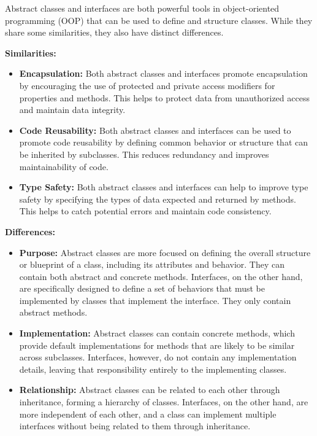 \documentclass[11pt]{article}
\begin{document}
Abstract classes and interfaces are both powerful tools in
object-oriented programming (OOP) that can be used to define and
structure classes. While they share some similarities, they also have
distinct differences.

\textbf{Similarities:}

\begin{itemize}
\item \textbf{Encapsulation:} Both abstract classes and interfaces promote
encapsulation by encouraging the use of protected and private access
modifiers for properties and methods. This helps to protect data from
unauthorized access and maintain data integrity.

\item \textbf{Code Reusability:} Both abstract classes and interfaces can be used
to promote code reusability by defining common behavior or structure
that can be inherited by subclasses. This reduces redundancy and
improves maintainability of code.

\item \textbf{Type Safety:} Both abstract classes and interfaces can help to
improve type safety by specifying the types of data expected and
returned by methods. This helps to catch potential errors and maintain
code consistency.
\end{itemize}

\textbf{Differences:}

\begin{itemize}
\item \textbf{Purpose:} Abstract classes are more focused on defining the overall
structure or blueprint of a class, including its attributes and
behavior. They can contain both abstract and concrete methods.
Interfaces, on the other hand, are specifically designed to define a
set of behaviors that must be implemented by classes that implement
the interface. They only contain abstract methods.

\item \textbf{Implementation:} Abstract classes can contain concrete methods, which
provide default implementations for methods that are likely to be
similar across subclasses. Interfaces, however, do not contain any
implementation details, leaving that responsibility entirely to the
implementing classes.

\item \textbf{Relationship:} Abstract classes can be related to each other through
inheritance, forming a hierarchy of classes. Interfaces, on the other
hand, are more independent of each other, and a class can implement
multiple interfaces without being related to them through inheritance.
\end{itemize}
\end{document}
